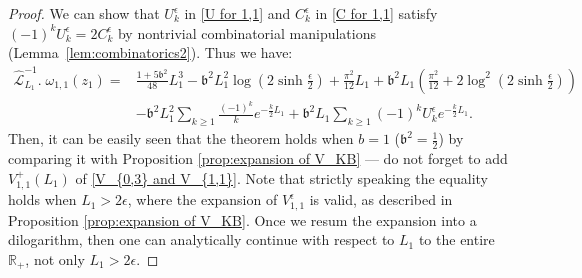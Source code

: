 \documentclass[12pt]{amsart}
\theoremstyle{plain}
\theoremstyle{definition}
\theoremstyle{remark}
\newtheorem{remark}[theorem]{Remark}
\numberwithin{equation}{section}
\begin{document}
\begin{proof}
We can show that $U_k^\epsilon$ in \eqref{U for 1,1} and $C_k^\epsilon$ in \eqref{C for 1,1} satisfy $(-1)^kU_k^\epsilon=2C_k^\epsilon$ by nontrivial combinatorial manipulations (Lemma~\ref{lem:combinatorics2}). Thus we have:
\begin{align*}
\hat{\mathcal{L}}_{L_1}^{-1}.\;\omega_{1,1}(z_1)=&\frac{1+5\mathfrak{b}^2}{48}L_1^3-\mathfrak{b}^2L_1^2\log\left(2\sinh\frac{\epsilon}{2}\right)+\frac{\pi^2}{12}L_1+\mathfrak{b}^2L_1\left(\frac{\pi^2}{12}+2\log^2\left(2\sinh\frac{\epsilon}{2}\right)\right)\nonumber\\
&-\mathfrak{b}^2L_1^2\sum_{k\geq1}\frac{(-1)^k}{k}e^{-\frac{k}{2}L_1}+\mathfrak{b}^2L_1\sum_{k\geq1}(-1)^k U^\epsilon_ke^{-\frac{k}{2}L_1}.
\end{align*}
Then, it can be easily seen that the theorem holds when $b=1$ ($\mathfrak{b}^2=\frac12$) by comparing it with Proposition \ref{prop:expansion of V_KB} --- do not forget to add $V_{1,1}^+(L_1)$ of \eqref{V_{0,3} and V_{1,1}}. Note that strictly speaking the equality holds when $L_1>2\epsilon$, where the expansion of $V_{1,1}^\epsilon$ is valid, as described in Proposition \ref{prop:expansion of V_KB}. Once we resum the expansion into a dilogarithm, then one can analytically continue with respect to $L_1$ to the entire $\mathbb{R}_+$, not only $L_1>2\epsilon$.
\end{proof}

\end{document}
